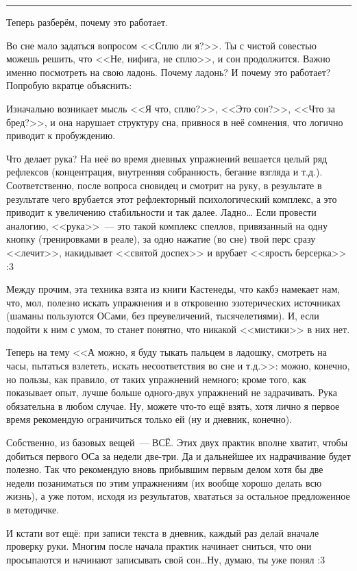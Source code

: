 \documentclass[a5paper,12pt,twoside]{memoir}
\begin{document}
\smallskip
\fancybreak{* * *}

Теперь разберём, почему это работает.

Во сне мало задаться вопросом <<Сплю ли я?>>. Ты с чистой совестью можешь решить, что <<Не, нифига, не сплю>>, и сон продолжится. Важно именно посмотреть на свою ладонь. Почему ладонь? И почему это работает? Попробую вкратце объяснить:

Изначально возникает мысль <<Я что, сплю?>>, <<Это сон?>>, <<Что за бред?>>, и она нарушает структуру сна, привнося в неё сомнения, что логично приводит к пробуждению.

Что делает рука? На неё во время дневных упражнений вешается целый ряд рефлексов (концентрация, внутренняя собранность, бегание взгляда и т.д.). Соответственно, после вопроса сновидец и смотрит на руку, в результате в результате чего врубается этот рефлекторный психологический комплекс, а это приводит к увеличению стабильности и так далее.
Ладно\ldots{} Если провести аналогию, <<рука>>~--- это такой комплекс спеллов, привязанный на одну кнопку (тренировками в реале), за одно нажатие (во сне) твой перс сразу <<лечит>>, накидывает <<святой доспех>> и врубает <<ярость берсерка>> :3

Между прочим, эта техника взята из книги Кастенеды, что какбэ намекает нам, что, мол, полезно искать упражнения и в откровенно эзотерических источниках (шаманы пользуются ОСами, без преувеличений, тысячелетиями). И, если подойти к ним с умом, то станет понятно, что никакой <<мистики>> в них нет. 

Теперь на тему <<А можно, я буду тыкать пальцем в ладошку, смотреть на часы, пытаться взлететь, искать несоответствия во сне и т.д.>>: можно, конечно, но пользы, как правило, от таких упражнений немного; кроме того, как показывает опыт, лучше больше одного-двух упражнений не задрачивать. Рука обязательна в любом случае. Ну, можете что-то ещё взять, хотя лично я первое время рекомендую ограничиться только ей (ну и дневник, конечно).

Собственно, из базовых вещей~--- ВСЁ. Этих двух практик вполне хватит, чтобы добиться первого ОСа за недели две-три. Да и дальнейшее их надрачивание будет полезно.
Так что рекомендую вновь прибывшим первым делом хотя бы две недели позаниматься по этим упражнениям (их вообще хорошо делать всю жизнь), а уже потом, исходя из результатов, хвататься за остальное предложенное в методичке. 

И кстати вот ещё: при записи текста в дневник, каждый раз делай вначале проверку руки. Многим после начала практик начинает сниться, что они просыпаются и начинают записывать свой сон\ldots Ну, думаю, ты уже понял :3 
\end{document}
